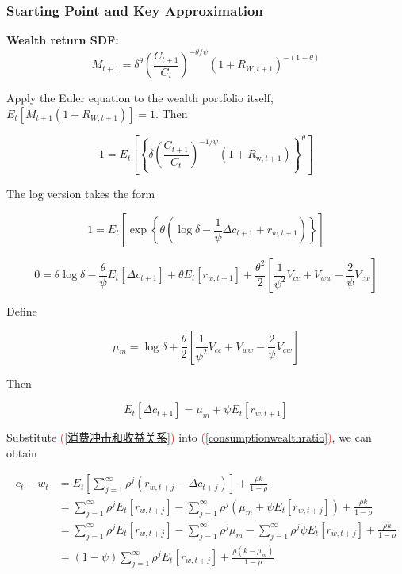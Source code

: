 \documentclass{beamer}
\begin{document}
\begin{frame}[allowframebreaks]
    \frametitle{Starting Point and Key Approximation}
    
    \textbf{Wealth return SDF:}
    \begin{equation*}
        M_{t+1} = \delta^{\theta} \left( \frac{C_{t+1}}{C_t} \right)^{-\theta/\psi} (1 + R_{W,t+1})^{-(1-\theta)}
    \end{equation*}

    Apply the Euler equation to the wealth portfolio itself, $E_t[M_{t+1}(1+R_{W,t+1})]=1$. Then

    \begin{equation*}
        1=E_t\left[\left\{\delta\left(\frac{C_{t+1}}{C_t}\right)^{-1 / \psi}  (1 + R_{\mathrm{w}, t+1})\right\}^\theta\right]
    \end{equation*}

    The log version takes the form 

    \begin{equation*}
1=E_t\left[\exp \left\{\theta\left(\log \delta-\frac{1}{\psi} \Delta c_{t+1}+r_{w, t+1}\right)\right\}\right]
\end{equation*}

    \framebreak

\begin{equation*}
0 = \theta\log\delta - \frac{\theta}{\psi}E_t[\Delta c_{t+1}] + \theta E_t[r_{w,t+1}]  + \frac{\theta^2}{2}\left[\frac{1}{\psi^2}V_{cc} + V_{ww} - \frac{2}{\psi}V_{cw}\right] 
\end{equation*}

Define

\begin{equation*}
\mu_m=\log \delta+\frac{\theta}{2}\left[\frac{1}{\psi^2} V_{c c}+V_{w w}-\frac{2}{\psi} V_{c w}\right]
\end{equation*}

Then

\begin{equation}
E_t\left[\Delta c_{t+1}\right]=\mu_m+\psi E_t\left[r_{w, t+1}\right]\label{消费冲击和收益关系}
\end{equation}

\framebreak

Substitute \textcolor{red}{(\ref{消费冲击和收益关系})} into \textcolor{red}{(\ref{consumptionwealthratio})}, we can obtain

\begin{equation}
\begin{aligned}
  c_t - w_t &= E_t \left[\sum_{j=1}^{\infty} \rho^{j}\left(r_{w, t+j}-\Delta c_{t+j}\right)\right] +\frac{\rho k}{1-\rho} \\
&= \sum_{j=1}^{\infty} \rho^{j} E_t[r_{w, t+j}] - \sum_{j=1}^{\infty} \rho^{j} (\mu_m + \psi E_t[r_{w,t+j}]) +\frac{\rho k}{1-\rho}\\
&= \sum_{j=1}^{\infty} \rho^{j} E_t[r_{w, t+j}] - \sum_{j=1}^{\infty} \rho^{j} \mu_m - \sum_{j=1}^{\infty} \rho^{j} \psi E_t[r_{w,t+j}] +\frac{\rho k}{1-\rho}\\
&= (1-\psi) \sum_{j=1}^{\infty} \rho^{j} E_t[r_{w, t+j}] + \frac{\rho(k - \mu_m)}{1-\rho}
\end{aligned}  
\end{equation}


\end{frame}
\end{document}

